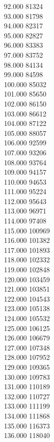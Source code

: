 { 92.000	81324 \\
 93.000	81798 \\
 94.000	82317 \\
 95.000	82827 \\
 96.000	83383 \\
 97.000	83752 \\
 98.000	84134 \\
 99.000	84598 \\
 100.000	85032 \\
 101.000	85650 \\
 102.000	86150 \\
 103.000	86612 \\
 104.000	87122 \\
 105.000	88057 \\
 106.000	92599 \\
 107.000	93206 \\
 108.000	93764 \\
 109.000	94157 \\
 110.000	94653 \\
 111.000	95224 \\
 112.000	95643 \\
 113.000	96971 \\
 114.000	97408 \\
 115.000	100969 \\
 116.000	101382 \\
 117.000	101893 \\
 118.000	102332 \\
 119.000	102848 \\
 120.000	103459 \\
 121.000	103851 \\
 122.000	104543 \\
 123.000	105138 \\
 124.000	105532 \\
 125.000	106125 \\
 126.000	106679 \\
 127.000	107348 \\
 128.000	107952 \\
 129.000	109365 \\
 130.000	109783 \\
 131.000	110189 \\
 132.000	110727 \\
 133.000	111199 \\
 134.000	111868 \\
 135.000	116373 \\
 136.000	118040 \\
}
